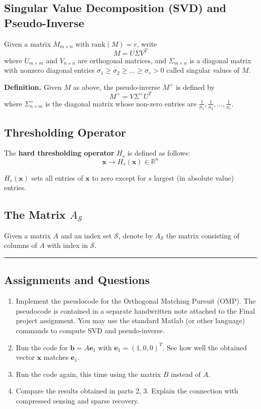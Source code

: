 \subsection*{Singular Value Decomposition (SVD) and Pseudo-Inverse}

Given a matrix $M_{m \times n}$ with $\text{rank}(M) = r$, write
$$M = U\Sigma V^T$$
where $U_{m \times m}$ and $V_{n \times n}$ are orthogonal matrices, and $\Sigma_{m \times n}$ is a diagonal matrix with nonzero diagonal entries $\sigma_1 \geq \sigma_2 \geq \ldots \geq \sigma_r > 0$ called singular values of $M$.

\textbf{Definition.} Given $M$ as above, the pseudo-inverse $M^+$ is defined by
$$M^+ = V\Sigma^+ U^T$$
where $\Sigma^+_{n \times m}$ is the diagonal matrix whose non-zero entries are $\frac{1}{\sigma_1}, \frac{1}{\sigma_2}, \ldots, \frac{1}{\sigma_r}$.

\subsection*{Thresholding Operator}

The \textbf{hard thresholding operator} $H_s$ is defined as follows:
$$\mathbf{x} \to H_s(\mathbf{x}) \in \mathbb{R}^n$$

$H_s(\mathbf{x})$ sets all entries of $\mathbf{x}$ to zero except for $s$ largest (in absolute value) entries.

\subsection*{The Matrix $A_\mathcal{S}$}

Given a matrix $A$ and an index set $\mathcal{S}$, denote by $A_\mathcal{S}$ the matrix consisting of columns of $A$ with index in $\mathcal{S}$.

\noindent\rule{\textwidth}{0.4pt}

\vspace{1em}

\subsection*{Assignments and Questions}

\begin{enumerate}
\item Implement the pseudocode for the Orthogonal Matching Pursuit (OMP). The pseudocode is contained in a separate handwritten note attached to the Final project assignment. You may use the standard Matlab (or other language) commands to compute SVD and pseudo-inverse.

\item Run the code for $\mathbf{b} = A\mathbf{e}_1$ with $\mathbf{e}_1 = (1, 0, 0)^T$. See how well the obtained vector $\mathbf{x}$ matches $\mathbf{e}_1$.

\item Run the code again, this time using the matrix $B$ instead of $A$.

\item Compare the results obtained in parts 2, 3. Explain the connection with compressed sensing and sparse recovery.
\end{enumerate}

